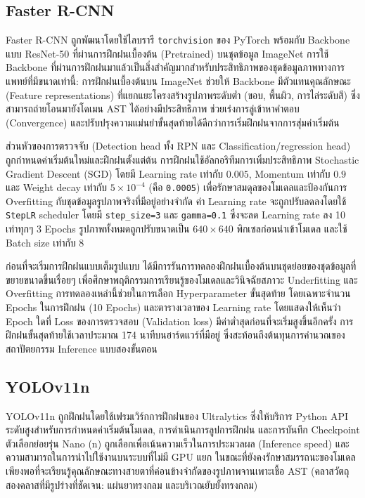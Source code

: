 \subsection{Faster R-CNN}

Faster R-CNN ถูกพัฒนาโดยใช้ไลบรารี \texttt{torchvision} ของ PyTorch พร้อมกับ Backbone แบบ ResNet-50 ที่ผ่านการฝึกฝนเบื้องต้น (Pretrained) บนชุดข้อมูล ImageNet \cite{he2016deep} การใช้ Backbone ที่ผ่านการฝึกฝนมาแล้วเป็นสิ่งสำคัญมากสำหรับประสิทธิภาพของชุดข้อมูลภาพทางการแพทย์ที่มีขนาดเท่านี้: การฝึกฝนเบื้องต้นบน ImageNet ช่วยให้ Backbone มีตัวแทนคุณลักษณะ (Feature representations) ที่แยกแยะโครงสร้างรูปภาพระดับต่ำ (ขอบ, พื้นผิว, การไล่ระดับสี) ซึ่งสามารถถ่ายโอนมายังโดเมน AST ได้อย่างมีประสิทธิภาพ ช่วยเร่งการลู่เข้าหาคำตอบ (Convergence) และปรับปรุงความแม่นยำขั้นสุดท้ายได้ดีกว่าการเริ่มฝึกฝนจากการสุ่มค่าเริ่มต้น

ส่วนหัวของการตรวจจับ (Detection head ทั้ง RPN และ Classification/regression head) ถูกกำหนดค่าเริ่มต้นใหม่และฝึกฝนตั้งแต่ต้น การฝึกฝนใช้อัลกอริทึมการเพิ่มประสิทธิภาพ Stochastic Gradient Descent (SGD) โดยมี Learning rate เท่ากับ $0.005$, Momentum เท่ากับ $0.9$ และ Weight decay เท่ากับ $5 \times 10^{-4}$ (คือ \texttt{0.0005}) เพื่อรักษาสมดุลของโมเดลและป้องกันการ Overfitting กับชุดข้อมูลรูปภาพจริงที่มีอยู่อย่างจำกัด ค่า Learning rate จะถูกปรับลดลงโดยใช้ \texttt{StepLR} scheduler โดยมี \texttt{step\_size=3} และ \texttt{gamma=0.1} ซึ่งจะลด Learning rate ลง 10 เท่าทุกๆ 3 Epochs รูปภาพทั้งหมดถูกปรับขนาดเป็น $640 \times 640$ พิกเซลก่อนนำเข้าโมเดล และใช้ Batch size เท่ากับ 8

ก่อนที่จะเริ่มการฝึกฝนแบบเต็มรูปแบบ ได้มีการรันการทดลองฝึกฝนเบื้องต้นบนชุดย่อยของชุดข้อมูลที่ขยายขนาดขึ้นเรื่อยๆ เพื่อศึกษาพฤติกรรมการเรียนรู้ของโมเดลและวินิจฉัยสภาวะ Underfitting และ Overfitting การทดลองเหล่านี้ช่วยในการเลือก Hyperparameter ขั้นสุดท้าย โดยเฉพาะจำนวน Epochs ในการฝึกฝน (10 Epochs) และตารางเวลาของ Learning rate โดยแสดงให้เห็นว่า Epoch ใดที่ Loss ของการตรวจสอบ (Validation loss) มีค่าต่ำสุดก่อนที่จะเริ่มสูงขึ้นอีกครั้ง การฝึกฝนขั้นสุดท้ายใช้เวลาประมาณ 174 นาทีบนฮาร์ดแวร์ที่มีอยู่ ซึ่งสะท้อนถึงต้นทุนการคำนวณของสถาปัตยกรรม Inference แบบสองขั้นตอน

\subsection{YOLOv11n}

YOLOv11n ถูกฝึกฝนโดยใช้เฟรมเวิร์กการฝึกฝนของ Ultralytics ซึ่งให้บริการ Python API ระดับสูงสำหรับการกำหนดค่าเริ่มต้นโมเดล, การดำเนินการลูปการฝึกฝน และการบันทึก Checkpoint \cite{wang2024yolov11} ตัวเลือกย่อยรุ่น Nano (n) ถูกเลือกเพื่อเน้นความเร็วในการประมวลผล (Inference speed) และความสามารถในการนำไปใช้งานบนระบบที่ไม่มี GPU แยก ในขณะที่ยังคงรักษาสมรรถนะของโมเดลเพียงพอที่จะเรียนรู้คุณลักษณะทางสายตาที่ค่อนข้างจำกัดของรูปภาพจานเพาะเชื้อ AST (คลาสวัตถุสองคลาสที่มีรูปร่างที่ชัดเจน: แผ่นยาทรงกลม และบริเวณยับยั้งทรงกลม)

